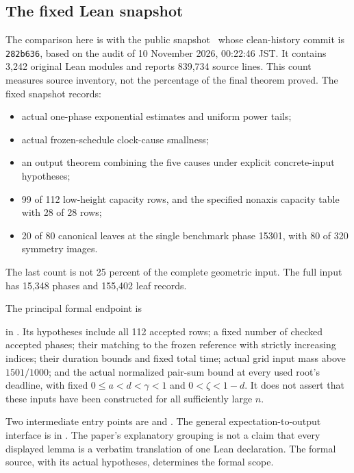 \subsection{The fixed Lean snapshot}
The comparison here is with the public snapshot~\cite{formal} whose clean-history
commit is \texttt{282b636}, based on the audit of 10 November 2026,
00:22:46 JST. It contains 3,242 original Lean modules and reports
839,734 source lines. This count measures source inventory, not the
percentage of the final theorem proved. The fixed snapshot records:
\begin{itemize}
\item actual one-phase exponential estimates and uniform power tails;
\item actual frozen-schedule clock-cause smallness;
\item an output theorem combining the five causes under explicit
concrete-input hypotheses;
\item 99 of 112 low-height capacity rows, and the specified nonaxis
capacity table with 28 of 28 rows;
\item 20 of 80 canonical leaves at the single benchmark phase 15301,
with 80 of 320 symmetry images.
\end{itemize}
The last count is not 25 percent of the complete geometric input.
The full input has 15,348 phases and 155,402 leaf records.

The principal formal endpoint is
\begin{center}
\small{}
\end{center}
in .
Its hypotheses include all 112 accepted rows; a fixed number of
checked accepted phases; their matching to the frozen reference with
strictly increasing indices; their duration bounds and fixed total
time; actual grid input mass above \(1501/1000\); and the actual
normalized pair-sum bound at every used root's deadline, with fixed
\(0\le a<d<\gamma<1\) and \(0<\zeta<1-d\).
It does not assert that these inputs have been constructed for all
sufficiently large \(n\).

Two intermediate entry points are
 and
.
The general expectation-to-output interface is in
.
The paper's explanatory grouping is not a claim that every displayed
lemma is a verbatim translation of one Lean declaration. The formal
source, with its actual hypotheses, determines the formal scope.

